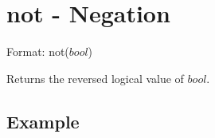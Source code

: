 
%

\section{not - Negation\label{sect:not}}

Format: not($bool$)

Returns the reversed logical value of $bool$.

\subsection*{Example}


%

